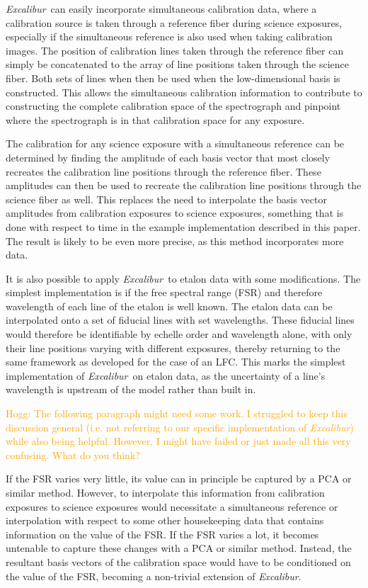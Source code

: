 \documentclass[modern]{aastex63}
\newcommand{\project}[1]{\textsl{#1}}
\newcommand{\name}{\project{Excalibur}}
\newcommand{\lz}[1]{\textcolor{orange}{#1}}
\begin{document}
\name\ can easily incorporate simultaneous calibration data, where a calibration source is taken through a reference fiber during science exposures, especially if the simultaneous reference is also used when taking calibration images.  The position of calibration lines taken through the reference fiber can simply be concatenated to the array of line positions taken through the science fiber.  Both sets of lines when then be used when the low-dimensional basis is constructed.  This allows the simultaneous calibration information to contribute to constructing the complete calibration space of the spectrograph and pinpoint where the spectrograph is in that calibration space for any exposure.

The calibration for any science exposure with a simultaneous reference can be determined by finding the amplitude of each basis vector that most closely recreates the calibration line positions through the reference fiber.  These amplitudes can then be used to recreate the calibration line positions through the science fiber as well.  This replaces the need to interpolate the basis vector amplitudes from calibration exposures to science exposures, something that is done with respect to time in the example implementation described in this paper.  The result is likely to be even more precise, as this method incorporates more data.

It is also possible to apply \name\ to etalon data with some modifications.  The simplest implementation is if the free spectral range (FSR) and therefore wavelength of each line of the etalon is well known.  The etalon data can be interpolated onto a set of fiducial lines with set wavelengths.  These fiducial lines would therefore be identifiable by echelle order and wavelength alone, with only their line positions varying with different exposures, thereby returning to the same framework as developed for the case of an LFC.  This marks the simplest implementation of \name\ on etalon data, as the uncertainty of a line's wavelength is upstream of the model rather than built in.

\lz{Hogg: The following paragraph might need some work.  I struggled to keep this discussion general (i.e. not referring to our specific implementation of \name) while also being helpful.  However, I might have failed or just made all this very confusing.  What do you think?}

If the FSR varies very little, its value can in principle be captured by a PCA or similar method.  However, to interpolate this information from calibration exposures to science exposures would necessitate a simultaneous reference or interpolation with respect to some other housekeeping data that contains information on the value of the FSR.  If the FSR varies a lot, it becomes untenable to capture these changes with a PCA or similar method.  Instead, the resultant basis vectors of the calibration space would have to be conditioned on the value of the FSR, becoming a non-trivial extension of \name.
\end{document}
